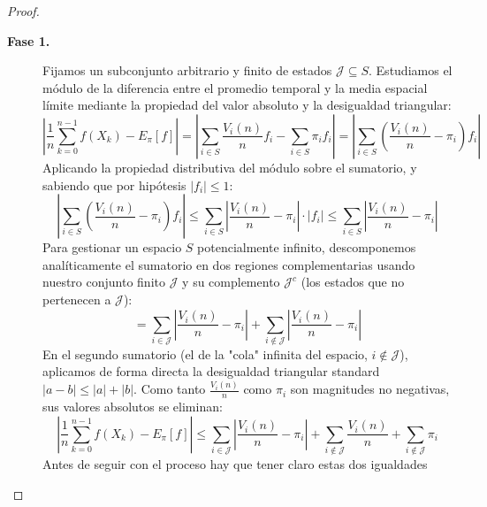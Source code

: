 \documentclass[10pt]{book}
\newcommand{\tbf}{\textbf}
\begin{document}
\begin{coro}
\begin{proof}
\begin{description}
    \item[\tbf{Fase 1.}] Fijamos un subconjunto arbitrario y finito de estados $\mathcal{J} \subseteq S$. Estudiamos el módulo de la diferencia entre el promedio temporal y la media espacial límite mediante la propiedad del valor absoluto y la desigualdad triangular:
        \[
        \left| \frac{1}{n} \sum_{k=0}^{n-1} f(X_k) - E_{\pi}[f] \right| = \left| \sum_{i \in S} \frac{V_i(n)}{n} f_i - \sum_{i \in S} \pi_i f_i \right| = \left| \sum_{i \in S} \left( \frac{V_i(n)}{n} - \pi_i \right) f_i \right|
        \]
        Aplicando la propiedad distributiva del módulo sobre el sumatorio, y sabiendo que por hipótesis $|f_i| \le 1$:
        \[
        \left| \sum_{i \in S} \left( \frac{V_i(n)}{n} - \pi_i \right) f_i \right| \le \sum_{i \in S} \left| \frac{V_i(n)}{n} - \pi_i \right| \cdot |f_i| \le \sum_{i \in S} \left| \frac{V_i(n)}{n} - \pi_i \right|
        \]
        Para gestionar un espacio $S$ potencialmente infinito, descomponemos analíticamente el sumatorio en dos regiones complementarias usando nuestro conjunto finito $\mathcal{J}$ y su complemento $\mathcal{J}^c$ (los estados que no pertenecen a $\mathcal{J}$):
        \[
        = \sum_{i \in \mathcal{J}} \left| \frac{V_i(n)}{n} - \pi_i \right| + \sum_{i \notin \mathcal{J}} \left| \frac{V_i(n)}{n} - \pi_i \right|
        \]
        En el segundo sumatorio (el de la "cola" infinita del espacio, $i \notin \mathcal{J}$), aplicamos de forma directa la desigualdad triangular standard $|a - b| \le |a| + |b|$. Como tanto $\frac{V_i(n)}{n}$ como $\pi_i$ son magnitudes no negativas, sus valores absolutos se eliminan:
        \[
        \left| \frac{1}{n} \sum_{k=0}^{n-1} f(X_k) - E_{\pi}[f] \right|  \le \sum_{i \in \mathcal{J}} \left| \frac{V_i(n)}{n} - \pi_i \right| + \sum_{i \notin \mathcal{J}} \frac{V_i(n)}{n} + \sum_{i \notin \mathcal{J}} \pi_i
        \]
        Antes de seguir con el proceso hay que tener claro estas dos igualdades


\end{description}
\end{proof}
\end{coro}
\end{document}
